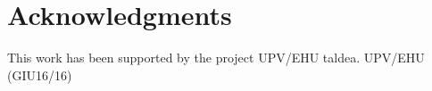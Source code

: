 \documentclass[11pt]{article}
\begin{document}
\section*{Acknowledgments}

This work has been supported by the project UPV/EHU taldea. UPV/EHU (GIU16/16)










\end{document}

